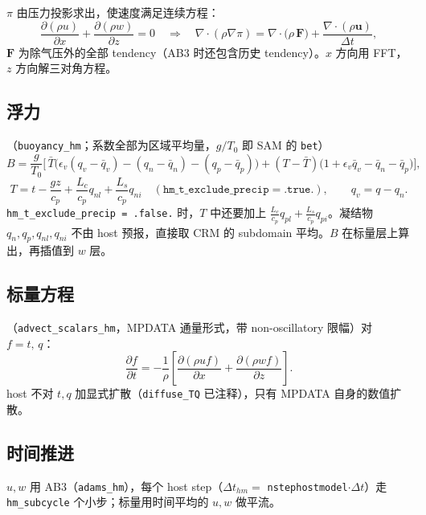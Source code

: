 \documentclass[11pt,a4paper]{article}
\newcommand{\code}[1]{\texttt{#1}}
\newcommand{\pd}[2]{\frac{\partial #1}{\partial #2}}
\begin{document}
$\pi$ 由压力投影求出，使速度满足连续方程：
\begin{equation}
\pd{(\rho u)}{x} + \pd{(\rho w)}{z} = 0
\quad\Longrightarrow\quad
\nabla\cdot(\rho\nabla\pi) = \nabla\cdot\big(\rho\,\mathbf{F}\big) + \frac{\nabla\cdot(\rho\mathbf{u})}{\Delta t},
\end{equation}
$\mathbf{F}$ 为除气压外的全部 tendency（AB3 时还包含历史 tendency）。$x$ 方向用 FFT，$z$ 方向解三对角方程。

\subsection{浮力}

（\code{buoyancy\_hm}；系数全部为区域平均量，$g/T_0$ 即 SAM 的 \code{bet}）
\begin{equation}
B = \frac{g}{T_0}\Big[\,\bar T\big(\epsilon_v (q_v-\bar q_v) - (q_n-\bar q_n) - (q_p-\bar q_p)\big)
 + (T-\bar T)\big(1+\epsilon_v\bar q_v-\bar q_n-\bar q_p\big)\Big],
\label{eq:B}
\end{equation}
\begin{equation}
T = t - \frac{gz}{c_p} + \frac{L_c}{c_p}q_{nl} + \frac{L_s}{c_p}q_{ni}\quad(\code{hm\_t\_exclude\_precip}=\code{.true.}),\qquad
q_v = q - q_n .
\end{equation}
\code{hm\_t\_exclude\_precip = .false.} 时，$T$ 中还要加上 $\frac{L_c}{c_p}q_{pl}+\frac{L_s}{c_p}q_{pi}$。凝结物 $q_n,q_p,q_{nl},q_{ni}$ 不由 host 预报，直接取 CRM 的 subdomain 平均。$B$ 在标量层上算出，再插值到 $w$ 层。

\subsection{标量方程}

（\code{advect\_scalars\_hm}，MPDATA 通量形式，带 non-oscillatory 限幅）对 $f=t,\,q$：
\begin{equation}
\pd{f}{t} = -\frac{1}{\rho}\left[\pd{(\rho u f)}{x} + \pd{(\rho w f)}{z}\right].
\label{eq:f}
\end{equation}
host 不对 $t,q$ 加显式扩散（\code{diffuse\_TQ} 已注释），只有 MPDATA 自身的数值扩散。

\subsection{时间推进}

$u,w$ 用 AB3（\code{adams\_hm}），每个 host step（$\Delta t_{hm}=$ \code{nstephostmodel}$\cdot\Delta t$）走 \code{hm\_subcycle} 个小步；标量用时间平均的 $u,w$ 做平流。
\end{document}
